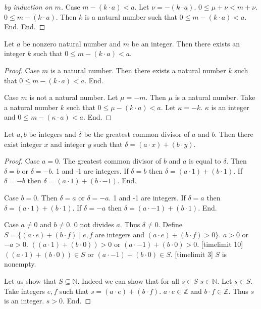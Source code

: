 \documentclass{article}
\begin{document}
\begin{forthel}
\begin{proof}[by induction on $m$]
Case $m - (k \cdot a) < a$. Let $\nu = -(k \cdot a)$.
$0 \leq \mu + \nu < m + \nu$. 
$0 \leq m - (k \cdot a)$.
Then $k$ is a natural number such that
$0 \leq  m - (k \cdot a) < a$. End.
End. 
\end{proof}

\begin{lemma}
Let $a$ be nonzero natural number and $m$ be an integer.
Then there exists an integer $k$ such that $0 \leq m - (k \cdot a) < a$.
\end{lemma}
\begin{proof}
Case $m$ is a natural number. Then there exists a natural number $k$ such that $0 \leq m - (k \cdot a) < a$. End.

Case $m$ is not a natural number. Let $\mu = -m$. Then $\mu$ is a natural number.
Take a natural number $k$ such that $0 \leq \mu - (k \cdot a) < a$. Let $\kappa = -k$. 
$\kappa$ is an integer and $0 \leq m - (\kappa \cdot a) < a$. End.
\end{proof}



\begin{theorem}[Bezout]
Let $a,b$ be integers and $\delta$ be the greatest common divisor of $a$ and $b$.
Then there exist integer $x$ and integer $y$ such that 
$\delta = (a \cdot x) + (b \cdot y)$. 
\end{theorem}
\begin{proof}
Case $a = 0$. The greatest common divisor of $b$ and $a$ is equal to $\delta$.
  Then $\delta = b$ or $\delta = -b$. 1 and -1 are integers. 
  If $\delta = b$ then $\delta = (a \cdot 1) + (b \cdot 1)$. If $\delta = -b$ then $\delta = (a \cdot 1) + (b \cdot -1)$. End. 

Case $b = 0$. Then $\delta = a$ or $\delta = -a$. 1 and -1 are integers. 
  If $\delta = a$ then $\delta = (a \cdot 1) + (b \cdot 1)$. If $\delta = -a$ then $\delta = (a \cdot -1) + (b \cdot 1)$. End. 

Case $a \neq  0$ and $b \neq 0$.
  $0$ not divides $a$. Thus $\delta \neq 0$.
  Define $S = \{ (a \cdot e) + (b \cdot f) \mid e,f$ are integers and 
  $(a \cdot e) + (b \cdot f) > 0\}$.
  $a > 0$ or $-a > 0$.
  $((a \cdot 1) + (b \cdot 0)) > 0$ or $(a \cdot -1) + (b \cdot 0) > 0$. 
  [timelimit 10] $((a \cdot 1) + (b \cdot 0)) \in S$ or $(a \cdot -1) + (b \cdot 0) \in S$. [timelimit 3]
  $S$ is nonempty.

  Let us show that $S \subseteq \mathbb{N}$.
    Indeed we can show that for all $s \in S$ $s \in \mathbb{N}$.
    Let $s \in S$.
    Take integers $e,f$ such that $s = (a \cdot e) + (b \cdot f)$. 
    $a \cdot e \in \mathbb{Z}$ and $b \cdot f \in \mathbb{Z}$. Thus $s$ is an integer.
    $s > 0$. 
  End.
    


\end{proof}
\end{forthel}
\end{document}
